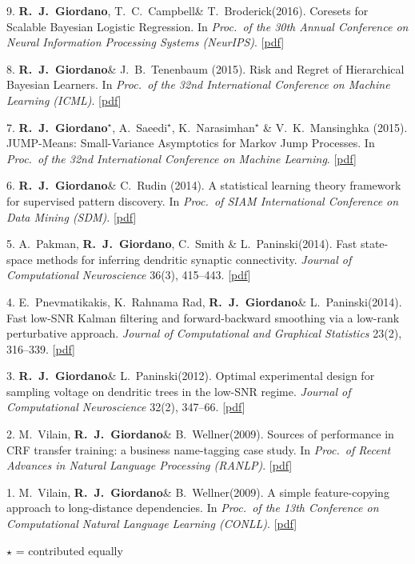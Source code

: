 \documentclass[margin,line]{res}
\newcommand{\me}{\textbf{R.~J.~Giordano}\xspace}
\newcommand{\mestar}{\textbf{R.~J.~Giordano}$^{\star}$\xspace}
\newcommand{\trevor}{T.~C.~Campbell\xspace}
\newcommand{\tamara}{T.~Broderick\xspace}
\newcommand{\liam}{L.~Paninski\xspace}
\newcommand{\vhw}{M.~Vilain, \me \& B.~Wellner\xspace}
\newcommand{\paperref}[1]{[\href{#1}{pdf}]}
\newcommand{\paperref}[1]{}
\begin{document}
\begin{resume}
9. \me, \trevor \& \tamara (2016).
Coresets for Scalable Bayesian Logistic Regression.
In \emph{Proc.~of the 30th Annual Conference on Neural Information Processing Systems (NeurIPS)}.
\paperref{http://arxiv.org/abs/1605.06423}

8. \me \& J.~B.~Tenenbaum (2015).
Risk and Regret of Hierarchical Bayesian Learners.
In \emph{Proc.~of the 32nd International Conference on Machine Learning (ICML)}.
\paperref{http://arxiv.org/abs/1505.04984}

7. \mestar, A.~Saeedi$^{\star}$, K.~Narasimhan$^{\star}$ \& V.~K.~Mansinghka (2015).
JUMP-Means: Small-Variance Asymptotics for Markov Jump Processes.
In \emph{Proc.~of the 32nd International Conference on Machine Learning}.
\paperref{http://arxiv.org/abs/1503.00332}

6. \me \& C.~Rudin (2014).
A statistical learning theory framework for supervised pattern discovery.
In {\em Proc.~of SIAM International Conference on Data Mining (SDM)}.
\paperref{http://www.jhhuggins.org/papers/HuRu-SDM-2014.pdf}

5. A.~Pakman, \me, C.~Smith \& \liam (2014).
Fast state-space methods for inferring dendritic synaptic connectivity.
{\em Journal of Computational Neuroscience} 36(3), 415--443.
\paperref{http://www.jhhuggins.org/papers/PHSP-JCNS-2014.pdf}

4. E.~Pnevmatikakis, K.~Rahnama Rad, \me \& \liam (2014).
Fast low-SNR Kalman filtering and forward-backward smoothing via a low-rank perturbative approach.
{\em Journal of Computational and Graphical Statistics} 23(2), 316--339. \paperref{http://www.jhhuggins.org/papers/PRHP-JCGS-2013.pdf}

3. \me \& \liam (2012).
Optimal experimental design for sampling voltage on dendritic trees in the low-SNR regime.
{\em Journal of Computational Neuroscience} 32(2), 347--66.
\paperref{http://www.jhhuggins.org/papers/HuPa-JCNS-2012.pdf}

2. \vhw (2009).
Sources of performance in CRF transfer training: a business name-tagging case study.
In {\em Proc.~of Recent Advances in Natural Language Processing (RANLP)}.
\paperref{http://www.jhhuggins.org/papers/VHW-RANLP-2009.pdf}

1. \vhw (2009).
A simple feature-copying approach to long-distance dependencies.
In {\em Proc.~of the 13th Conference on Computational Natural Language Learning (CONLL)}.
\paperref{http://www.jhhuggins.org/papers/VHW-CONLL-2009.pdf}

$\star$ = contributed equally


\end{resume}
\end{document}
